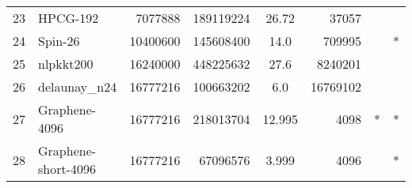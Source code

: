 \begin{tabular}{|l|l|r|r|S[round-mode=places,round-precision=2]|r|r|c|}
{23}& {HPCG-192}	& 7077888	& 189119224	& 26.72	& 37057	& {} &{}\\
{24}& {Spin-26}	& 10400600	& 145608400	& 14.0	& 709995	& {} &{*}\\
{25}& {nlpkkt200}	& 16240000	& 448225632	& 27.6	& 8240201	& {} &{}\\
{26}& {delaunay\_n24}	& 16777216	& 100663202	& 6.0	& 16769102	& {} &{}\\
{27}& {Graphene-4096}	& 16777216	& 218013704	& 12.995	& 4098	& {*} &{*}\\
{28}& {Graphene-short-4096}	& 16777216	& 67096576	& 3.999	& 4096	& {} &{*}\\
\bottomrule
\end{tabular}


